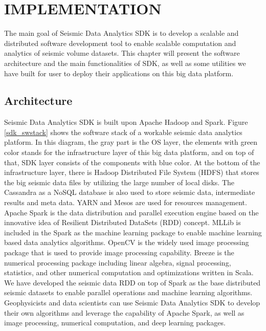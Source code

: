 %
%
%

\chapter{\uppercase{Implementation}}

The main goal of Seismic Data Analytics SDK is to develop a scalable and distributed software development tool to enable scalable computation and analytics of seismic volume datasets. This chapter will present the software architecture and the main functionalities of SDK, as well as some utilities we have built for user to deploy their applications on this big data platform.

\section{Architecture}

Seismic Data Analytics SDK is built upon Apache Hadoop and Spark. Figure \ref{sdk_swstack} shows the software stack of a workable seismic data analytics platform. In this diagram, the gray part is the OS layer, the elements with green color stands for the infrastructure layer of this big data platform, and on top of that, SDK layer consists of the components with blue color. At the bottom of the infrastructure layer, there is Hadoop Distributed File System (HDFS) that stores the big seismic data files by utilizing the large number of local disks. The Cassandra as a NoSQL database is also used to store  seismic data, intermediate results and meta data. YARN and Mesos are used for resources management. Apache Spark is the data distribution and parallel execution engine based on the innovative idea of Resilient Distributed DataSets (RDD) concept. MLLib is included in the Spark as the machine learning package to enable machine learning based data analytics algorithms. OpenCV is the widely used image processing package that is used to provide image processing capability. Breeze is the numerical processing package including linear algebra, signal processing, statistics, and other numerical computation and optimizations written in Scala. We have developed the seismic data RDD on top of Spark as the base distributed seismic datasets to enable parallel operations and machine learning algorithms. Geophysicists and data scientists can use  Seismic Data Analytics SDK to develop their own algorithms and leverage the capability of Apache Spark, as well as image processing, numerical computation, and deep learning packages.

